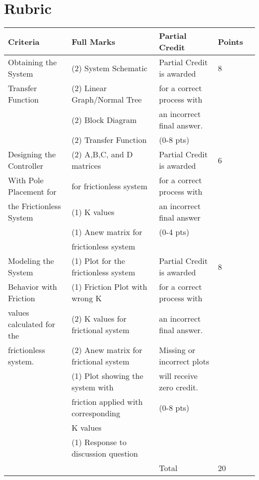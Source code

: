 \documentclass{homework}
\begin{document}
\section*{Rubric}

\begin{center}
\begin{tabular}{ | l | l | l | l | l |}
\hline
Criteria & Full Marks & Partial Credit & Points\\ \hline
Obtaining the System & (2) System Schematic & Partial Credit is awarded & 8 \\Transfer Function&(2) Linear Graph/Normal Tree &  for a correct process with & \\&(2) Block Diagram &  an incorrect final answer. & \\&(2) Transfer Function &  (0-8 pts) &
 \\ \hline
Designing the Controller & (2) A,B,C, and D matrices  & Partial Credit is awarded & 6\\With Pole Placement for & for frictionless system &for a correct process with&\\the Frictionless System & (1) K values & an incorrect final answer & \\ & (1) Anew matrix for & (0-4 pts) & \\ & frictionless system & &\\ \hline


Modeling the System & (1) Plot for the frictionless system& Partial Credit is awarded & 8\\Behavior with Friction &  (1) Friction Plot with wrong K & for a correct process with & \\values calculated for the & (2) K values for frictional system & an incorrect final answer. & \\frictionless system. & (2) Anew matrix for frictional system & Missing or incorrect plots & \\&(1) Plot showing the system with & will receive zero credit. & \\&friction applied with corresponding & (0-8 pts)&\\ &K values & & \\&(1) Response to discussion question & &\\
\hline
 &  & Total & 20 \\ \hline
\end{tabular}
\end{center}
\end{document}
